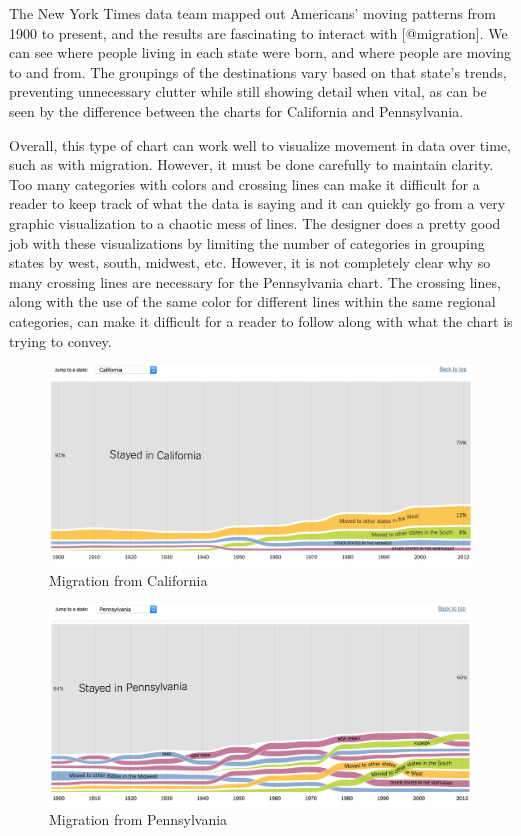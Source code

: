 \documentclass[]{book}
\theoremstyle{definition}
\theoremstyle{definition}
\theoremstyle{definition}
\theoremstyle{remark}
\begin{document}
The New York Times data team mapped out Americans' moving patterns from
1900 to present, and the results are fascinating to interact with
{[}@migration{]}. We can see where people living in each state were
born, and where people are moving to and from. The groupings of the
destinations vary based on that state's trends, preventing unnecessary
clutter while still showing detail when vital, as can be seen by the
difference between the charts for California and Pennsylvania.

Overall, this type of chart can work well to visualize movement in data
over time, such as with migration. However, it must be done carefully to
maintain clarity. Too many categories with colors and crossing lines can
make it difficult for a reader to keep track of what the data is saying
and it can quickly go from a very graphic visualization to a chaotic
mess of lines. The designer does a pretty good job with these
visualizations by limiting the number of categories in grouping states
by west, south, midwest, etc. However, it is not completely clear why so
many crossing lines are necessary for the Pennsylvania chart. The
crossing lines, along with the use of the same color for different lines
within the same regional categories, can make it difficult for a reader
to follow along with what the chart is trying to convey.

\begin{figure}
\centering
\includegraphics{images/CA_migration.png}
\caption{Migration from California}
\end{figure}

\begin{figure}
\centering
\includegraphics{images/PA_migration.png}
\caption{Migration from Pennsylvania}
\end{figure}
\end{document}
